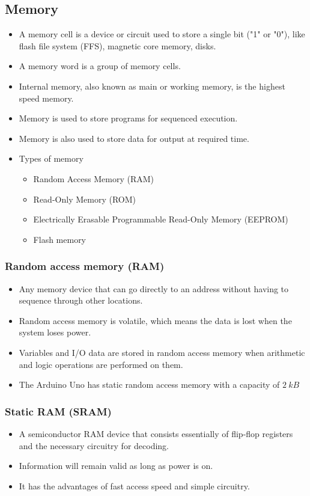 \documentclass[11pt]{article}
\begin{document}
\subsection{Memory}
\label{sec:org1bf17c3}
\begin{itemize}
\item A memory cell is a device or circuit used to store a single bit ("1" or "0"), like flash file system (FFS), magnetic core memory, disks.
\item A memory word is a group of memory cells.
\item Internal memory, also known as main or working memory, is the highest speed memory.
\item Memory is used to store programs for sequenced execution.
\item Memory is also used to store data for output at required time.
\item Types of memory
\begin{itemize}
\item Random Access Memory (RAM)
\item Read-Only Memory (ROM)
\item Electrically Erasable Programmable Read-Only Memory (EEPROM)
\item Flash memory
\end{itemize}
\end{itemize}

\subsubsection{Random access memory (RAM)}
\label{sec:orgb0151d1}
\begin{itemize}
\item Any memory device that can go directly to an address without having to sequence through other locations.
\item Random access memory is volatile, which means the data is lost when the system loses power.
\item Variables and I/O data are stored in random access memory when arithmetic and logic operations are performed on them.
\item The Arduino Uno has static random access memory with a capacity of \(\qty{2}{kB}\)
\end{itemize}

\subsubsection{Static RAM (SRAM)}
\label{sec:org59f90fd}
\begin{itemize}
\item A semiconductor RAM device that consists essentially of flip-flop registers and the necessary circuitry for decoding.
\item Information will remain valid as long as power is on.
\item It has the advantages of fast access speed and simple circuitry.
\end{itemize}
\end{document}
